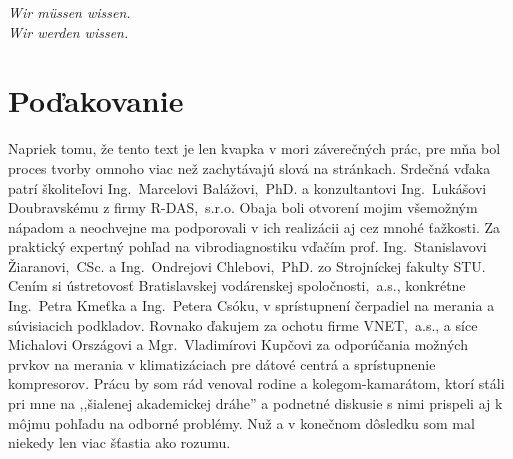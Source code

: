 \thispagestyle{empty}
\vspace*{\fill}

\begin{center}
\settowidth{}
\parbox{\longest}{
  \hrulefill\hspace{0.2cm} \decofourleft\decofourright \hspace{0.2cm} \hrulefill\par
  \raggedright{
  \itshape
  	Wir müssen wissen. \\ Wir werden wissen.\par
  }   
  \par
  \hrulefill\hspace{0.2cm} \decofourleft\decofourright\hspace{0.2cm} \hrulefill\par
}
\end{center}

\vspace*{\fill}
\section*{Poďakovanie}
{\linespread{1.0}\small Napriek tomu, že tento text je len kvapka v mori záverečných prác, pre mňa bol proces tvorby omnoho viac než zachytávajú slová na stránkach. Srdečná vďaka patrí školiteľovi Ing.~Marcelovi Balážovi,~PhD. a konzultantovi Ing.~Lukášovi Doubravskému z firmy R-DAS,~s.r.o. Obaja boli otvorení mojim všemožným nápadom a neochvejne ma podporovali v ich realizácii aj cez mnohé ťažkosti. Za praktický expertný pohľad na vibrodiagnostiku vďačím prof. Ing.~Stanislavovi Žiaranovi,~CSc. a Ing.~Ondrejovi Chlebovi,~PhD. zo Strojníckej fakulty STU. Cením si ústretovosť Bratislavskej vodárenskej spoločnosti,~a.s., konkrétne Ing.~Petra Kmeťka a Ing.~Petera Csóku, v sprístupnení čerpadiel na merania a súvisiacich podkladov. Rovnako ďakujem za ochotu firme VNET,~a.s., a síce Michalovi Országovi a Mgr.~Vladimírovi Kupčovi za odporúčania možných prvkov na merania v klimatizáciach pre dátové centrá a sprístupnenie kompresorov. Prácu by som rád venoval rodine a kolegom-kamarátom, ktorí stáli pri mne na ,,šialenej akademickej dráhe'' a podnetné diskusie s nimi prispeli aj k môjmu pohľadu na odborné problémy. Nuž a v konečnom dôsledku som mal niekedy len viac šťastia ako rozumu.}
\vspace{3cm}